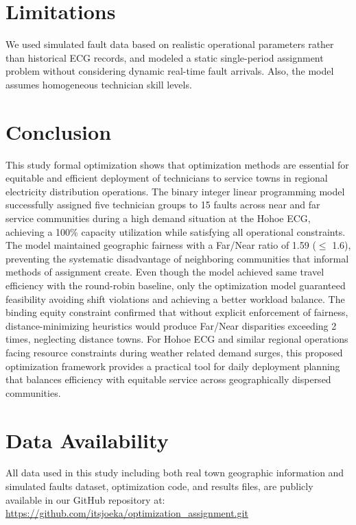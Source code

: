 \documentclass[11pt]{article}
\begin{document}
\section*{Limitations}
We used simulated fault data based on realistic operational parameters rather than historical ECG records, and modeled a static single-period assignment problem without considering dynamic real-time fault arrivals. Also, the model assumes homogeneous technician skill levels.


\section*{Conclusion}
This study formal optimization shows that optimization methods are essential for equitable and efficient deployment of technicians to service towns in regional electricity distribution operations. The binary integer linear programming model successfully assigned five technician groups to 15 faults across near and far service communities during a high demand situation at the Hohoe ECG, achieving a 100\% capacity utilization while satisfying all operational constraints. The model maintained geographic fairness with a Far/Near ratio of 1.59 ($\leq$ 1.6), preventing the systematic disadvantage of neighboring communities that informal methods of assignment create. Even though the model achieved same travel efficiency with the round-robin baseline, only the optimization model guaranteed feasibility avoiding shift violations and achieving a better workload balance. The binding equity constraint confirmed that without explicit enforcement of fairness, distance-minimizing heuristics would produce Far/Near disparities exceeding 2 times, neglecting distance towns. For Hohoe ECG and similar regional operations facing resource constraints during weather related demand surges, this proposed optimization framework provides a practical tool for daily deployment planning that balances efficiency with equitable service across geographically dispersed communities. 


\section*{Data Availability}
All data used in this study including both real town geographic information and simulated faults dataset, optimization code, and results files, are publicly available in our GitHub repository at: \url{https://github.com/itsjoeka/optimization_assignment.git}
\end{document}
